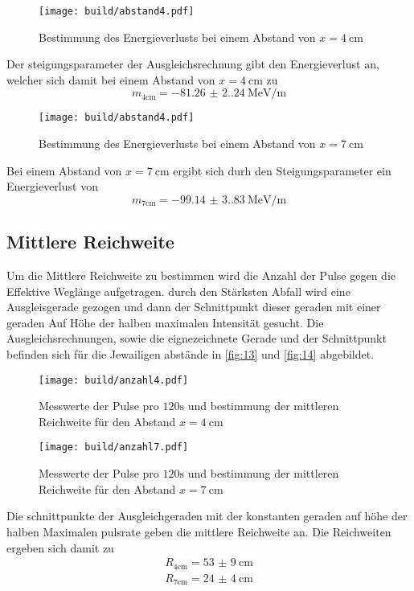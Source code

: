 \begin{figure}[H]
  \centering
  \caption{Bestimmung des Energieverlusts bei einem Abstand von $x = \qty{4}{\centi\meter}$}
  \label{fig:11}
  \texttt{[image: build/abstand4.pdf]}
\end{figure}
Der steigungsparameter der Ausgleichsrechnung gibt den Energieverlust an, welcher sich damit bei einem Abstand von 
$x = \qty{4}{\centi\meter}$ zu 
\begin{equation}
  m_\text{4cm} = \qty{-81.26(2.24)}{\mega\electronvolt\per\meter}
\end{equation}

\begin{figure}[H]
  \centering
  \caption{Bestimmung des Energieverlusts bei einem Abstand von $x = \qty{7}{\centi\meter}$}
  \label{fig:12}
  \texttt{[image: build/abstand4.pdf]}
\end{figure}
Bei einem Abstand von $x = \qty{7}{\centi\meter}$ ergibt sich durh den Steigungsparameter 
ein Energieverlust von 
\begin{equation}
  m_\text{7cm} = \qty{-99.14(3.83)}{\mega\electronvolt\per\meter}
\end{equation}

\subsection{Mittlere Reichweite}
Um die Mittlere Reichweite zu bestimmen wird die Anzahl der Pulse gegen die Effektive Weglänge 
aufgetragen. durch den Stärksten Abfall wird eine Ausgleisgerade gezogen und dann der Schnittpunkt dieser geraden mit einer geraden Auf 
Höhe der halben maximalen Intensität gesucht. Die Ausgleichsrechnungen, sowie die eignezeichnete Gerade und 
der Schnittpunkt befinden sich für die Jewailigen abstände in \autoref{fig:13} und \autoref{fig:14} abgebildet.

\begin{figure}[H]
  \centering
  \caption{Messwerte der Pulse pro $120\unit{\second}$ und bestimmung der mittleren Reichweite für den Abstand $x = \qty{4}{\centi\meter}$}
  \label{fig:13}
  \texttt{[image: build/anzahl4.pdf]}
\end{figure}

\begin{figure}[H]
  \centering
  \caption{Messwerte der Pulse pro $120\unit{\second}$ und bestimmung der mittleren Reichweite für den Abstand $x = \qty{7}{\centi\meter}$}
  \label{fig:14}
  \texttt{[image: build/anzahl7.pdf]}
\end{figure}

Die schnittpunkte der Ausgleichgeraden mit der konstanten geraden auf höhe der halben Maximalen pulsrate 
geben die mittlere Reichweite an. Die Reichweiten ergeben sich damit zu 
\begin{align}
  R_\text{4cm} = \qty{53(9)}{\centi\meter}\\
  R_\text{7cm} = \qty{24(4)}{\centi\meter}
\end{align}